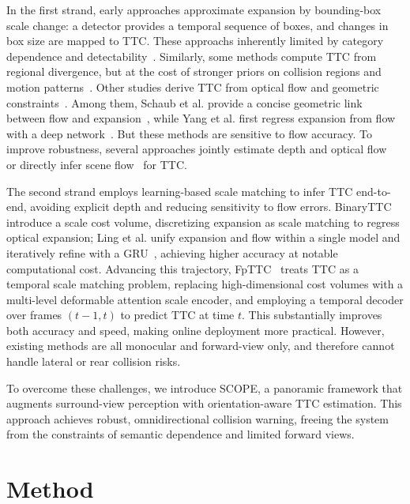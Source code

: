 \documentclass[journal]{IEEEtran}
\begin{document}
In the first strand, early approaches approximate expansion by bounding-box scale change: a detector provides a temporal sequence of boxes, and changes in box size are mapped to TTC. These approachs inherently limited by category dependence and detectability~\cite{ibrahim2020real,lin2020vision}. Similarly, some methods compute TTC from regional divergence, but at the cost of stronger priors on collision regions and motion patterns~\cite{kilicarslan2018predict}. Other studies derive TTC from optical flow and geometric constraints~\cite{beverley1983texture,camus1995calculating,meyer1994time,swanston1986perceived,schaub2016reactive,yang2020opticalexpansion}. Among them, Schaub et al. provide a concise geometric link between flow and expansion~\cite{schaub2016reactive}, while Yang et al. first regress expansion from flow with a deep network~\cite{yang2020opticalexpansion}. But these methods are sensitive to flow accuracy. To improve robustness, several approaches jointly estimate depth and optical flow~\cite{yin2018geonet,yoon2020novel,luo2019every} or directly infer scene flow~\cite{hur2020self,jiang20243dsflabelling} for TTC.

The second strand employs learning-based scale matching to infer TTC end-to-end, avoiding explicit depth and reducing sensitivity to flow errors. BinaryTTC~\cite{badki2021binaryttc} introduce a scale cost volume, discretizing expansion as scale matching to regress optical expansion; Ling et al. unify expansion and flow within a single model and iteratively refine with a GRU~\cite{ling2022scale, ling2023learning}, achieving higher accuracy at notable computational cost. Advancing this trajectory, FpTTC~\cite{li2024fpttc} treats TTC as a temporal scale matching problem, replacing high-dimensional cost volumes with a multi-level deformable attention scale encoder, and employing a temporal decoder over frames \((t-1,t)\) to predict TTC at time \(t\). This substantially improves both accuracy and speed, making online deployment more practical. However, existing methods are all monocular and forward-view only, and therefore cannot handle lateral or rear collision risks.

To overcome these challenges, we introduce SCOPE, a panoramic framework that augments surround-view perception with orientation-aware TTC estimation. This approach achieves robust, omnidirectional collision warning, freeing the system from the constraints of semantic dependence and limited forward views.

\section{Method}
\label{sec:methd}
\end{document}
